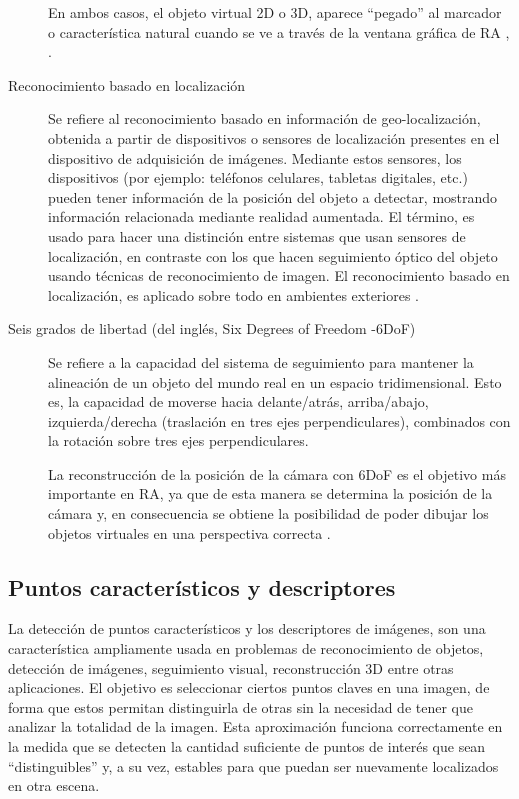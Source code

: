 \begin{description}
  En ambos casos, el objeto virtual 2D o 3D, aparece ``pegado'' al marcador o característica natural cuando se ve a través de la ventana gráfica de RA \cite{conf/iswc/2007}, \cite{1320421}.
  \item [Reconocimiento basado en localización] 
  Se refiere al reconocimiento basado en información de geo-localización, obtenida a partir de dispositivos o sensores de localización presentes en el dispositivo de adquisición de imágenes. Mediante estos sensores, los dispositivos (por ejemplo: teléfonos celulares, tabletas digitales, etc.) pueden tener información de la posición del objeto a detectar, mostrando información relacionada mediante realidad aumentada.
  El término, es usado para hacer una distinción entre sistemas que usan sensores de localización, en contraste con los que hacen seguimiento óptico del objeto usando técnicas de reconocimiento de imagen. El reconocimiento basado en localización, %
es aplicado sobre todo en ambientes exteriores \cite{1320421, Azuma:2001:RAA:616073.618862}.
  \item [Seis grados de libertad (del inglés, Six Degrees of Freedom -6DoF)] 
  Se refiere a la capacidad del sistema de seguimiento para mantener la alineación de un objeto del mundo real en un espacio tridimensional. Esto es, la capacidad de moverse hacia delante/atrás, arriba/abajo, izquierda/derecha (traslación en tres ejes perpendiculares), combinados con la rotación sobre tres ejes perpendiculares.

  La reconstrucción de la posición de la cámara con 6DoF es el objetivo más importante en RA, ya que de esta manera se determina la posición de la cámara y, en consecuencia se obtiene la posibilidad de poder dibujar los objetos virtuales en una perspectiva correcta \cite{conf/iswc/2007, 1320421, Azuma:2001:RAA:616073.618862}.
\end{description}
\subsection{Puntos característicos y descriptores}
\label{sec:ptos_caract_descriptores}
La detección de puntos característicos y los descriptores de imágenes, son una característica ampliamente usada en problemas de reconocimiento de objetos, detección de imágenes, seguimiento visual, reconstrucción 3D entre otras aplicaciones. El objetivo es seleccionar ciertos puntos claves en una imagen, de forma que estos permitan distinguirla de otras sin la necesidad de tener que analizar la totalidad de la imagen.
Esta aproximación funciona correctamente en la medida que se detecten la cantidad suficiente de puntos de interés que sean ``distinguibles'' y, a su vez, estables para que puedan ser nuevamente localizados en otra escena.

